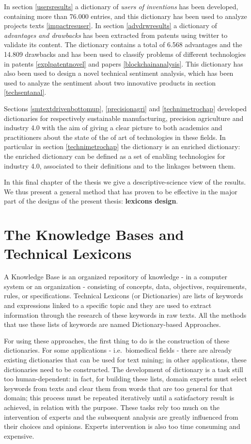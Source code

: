 \documentclass[b5paper,]{book}
\theoremstyle{definition}
\theoremstyle{definition}
\theoremstyle{definition}
\theoremstyle{remark}
\begin{document}
In section \ref{usersresults} a dictionary of \emph{users of inventions}
has been developed, containing more than 76.000 entries, and this
dictionary has been used to analyze projects texts \ref{impactresuser}.
In section \ref{advdrwresults} a dictionary of \emph{advantages and
drawbacks} has been extracted from patents using twitter to validate its
content. The dictionary contains a total of 6.568 advantages and the
14.809 drawbacks and has been used to classify problems of different
technologies in patents \ref{explpatentnovel} and papers
\ref{blockchainanalysis}. This dictionary has also been used to design a
novel technical sentiment analysis, which has been used to analyze the
sentiment about two innovative products in section \ref{techsentanal}.

Sections \ref{smtextdrivenbottomup}, \ref{precisionagri} and
\ref{technimetrochap} developed dictionaries for respectively
sustainable manufacturing, precision agriculture and industry 4.0 with
the aim of giving a clear picture to both academics and practitioners
about the state of the of art of technologies in these fields. In
particular in section \ref{technimetrochap} the dictionary is an
enriched dictionary: the enriched dictionary can be defined as a set of
enabling technologies for industry 4.0, associated to their definitions
and to the linkages between them.

In this final chapter of the thesis we give a descriptive-science view
of the results. We thus present a general method that has proven to be
effective in the major part of the designs of the present thesis:
\textbf{lexicons design}.

\section{The Knowledge Bases and Technical
Lexicons}\label{the-knowledge-bases-and-technical-lexicons}

A Knowledge Base is an organized repository of knowledge - in a computer
system or an organization - consisting of concepts, data, objectives,
requirements, rules, or specifications. Technical Lexicons (or
Dictionaries) are lists of keywords and expressions linked to a specific
topic and they are used to extract information through the research of
these keywords in raw texts. All the methods that use these lists of
keywords are named Dictionary-based Approaches.

For using these approaches, the first thing to do is the construction of
these dictionaries. For some applications - i.e.~biomedical fields -
there are already existing dictionaries that can be used for text
mining; in other applications, these dictionaries need to be
constructed. The development of dictionary is a task still too
human-dependent: in fact, for building these lists, domain experts must
select keywords from texts and clear them from words that are too
general for that domain; this process must be repeated iteratively until
a satisfactory result is achieved, in relation with the purpose. These
tasks rely too much on the intervention of experts and the subsequent
analysis are greatly influenced from their choices and opinions. Experts
intervention is also too time consuming and expensive.
\end{document}
